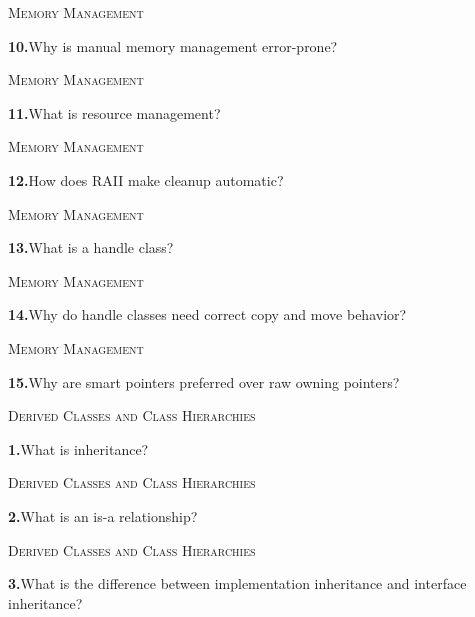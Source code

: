 \documentclass[11pt,a4paper]{article}
\newenvironment{questionblock}{%
  \begin{minipage}[t][0.455\textheight][t]{\textwidth}%
  \raggedright\small
}{%
  \vfill
  \end{minipage}%
}
\newcommand{\sectionlabel}[1]{\textsc{#1}\par\vspace{0.35em}}
\newcommand{\questionnumber}[1]{\textbf{#1.}\enspace}
\begin{document}
\vspace*{0.04\textheight}
\begin{questionblock}
\sectionlabel{Memory Management}
\questionnumber{10}Why is manual memory management error-prone?\par
\end{questionblock}
\newpage
\begin{questionblock}
\sectionlabel{Memory Management}
\questionnumber{11}What is resource management?\par
\end{questionblock}
\vspace*{0.04\textheight}
\begin{questionblock}
\sectionlabel{Memory Management}
\questionnumber{12}How does RAII make cleanup automatic?\par
\end{questionblock}
\newpage
\begin{questionblock}
\sectionlabel{Memory Management}
\questionnumber{13}What is a handle class?\par
\end{questionblock}
\vspace*{0.04\textheight}
\begin{questionblock}
\sectionlabel{Memory Management}
\questionnumber{14}Why do handle classes need correct copy and move behavior?\par
\end{questionblock}
\newpage
\begin{questionblock}
\sectionlabel{Memory Management}
\questionnumber{15}Why are smart pointers preferred over raw owning pointers?\par

\end{questionblock}
\vspace*{0.04\textheight}
\begin{questionblock}
\sectionlabel{Derived Classes and Class Hierarchies}
\questionnumber{1}What is inheritance?\par
\end{questionblock}
\newpage
\begin{questionblock}
\sectionlabel{Derived Classes and Class Hierarchies}
\questionnumber{2}What is an is-a relationship?\par
\end{questionblock}
\vspace*{0.04\textheight}
\begin{questionblock}
\sectionlabel{Derived Classes and Class Hierarchies}
\questionnumber{3}What is the difference between implementation inheritance and interface inheritance?\par
\end{questionblock}
\end{document}

